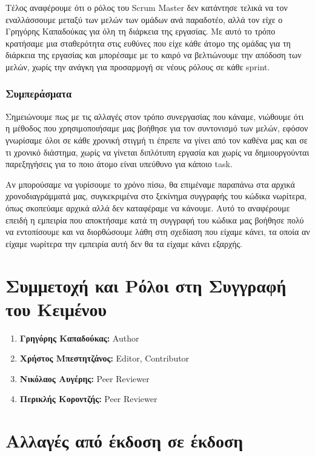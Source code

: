 \documentclass[12pt,a4paper]{article}
\begin{document}
Τέλος αναφέρουμε ότι ο ρόλος του Scrum Master δεν κατάντησε τελικά να τον εναλλάσσουμε μεταξύ των μελών των ομάδων ανά παραδοτέο, αλλά τον είχε ο Γρηγόρης Καπαδούκας για όλη τη διάρκεια της εργασίας. Με αυτό το τρόπο κρατήσαμε μια σταθερότητα στις ευθύνες που είχε κάθε άτομο της ομάδας για τη διάρκεια της εργασίας και μπορέσαμε με το καιρό να βελτιώνουμε την απόδοση των μελών, χωρίς την ανάγκη για προσαρμογή σε νέους ρόλους σε κάθε sprint.

\subsubsection{Συμπεράσματα}

Σημειώνουμε πως με τις αλλαγές στον τρόπο συνεργασίας που κάναμε, νιώθουμε ότι η μέθοδος που χρησιμοποιήσαμε μας βοήθησε για τον συντονισμό των μελών, εφόσον γνωρίσαμε όλοι σε κάθε χρονική στιγμή τι έπρεπε να γίνει από τον καθένα μας και σε τι χρονικό διάστημα, χωρίς να γίνεται διπλότυπη εργασία και χωρίς να δημιουργούνται παρεξηγήσεις για το ποιο άτομο είναι υπεύθυνο για κάποιο task.

Αν μπορούσαμε να γυρίσουμε το χρόνο πίσω, θα επιμέναμε παραπάνω στα αρχικά χρονοδιαγράμματά μας, συγκεκριμένα στο ξεκίνημα συγγραφής του κώδικα νωρίτερα, όπως σκοπεύαμε αρχικά αλλά δεν καταφέραμε να κάνουμε. Αυτό το αναφέρουμε επειδή η εμπειρία που αποκτήσαμε κατά τη συγγραφή του κώδικα μας βοήθησε πολύ να εντοπίσουμε και να διορθώσουμε λάθη στη σχεδίαση που είχαμε κάνει, τα οποία αν είχαμε νωρίτερα την εμπειρία αυτή δεν θα τα είχαμε κάνει εξαρχής.


\section{Συμμετοχή και Ρόλοι στη Συγγραφή του Κειμένου}
\begin{enumerate}
	\item \textbf{Γρηγόρης Καπαδούκας:} Author
	\item \textbf{Χρήστος Μπεστητζάνος:} Editor, Contributor
	\item \textbf{Νικόλαος Αυγέρης:} Peer Reviewer
	\item \textbf{Περικλής Κοροντζής:} Peer Reviewer
\end{enumerate}

\section{Αλλαγές από έκδοση σε έκδοση}
\end{document}
